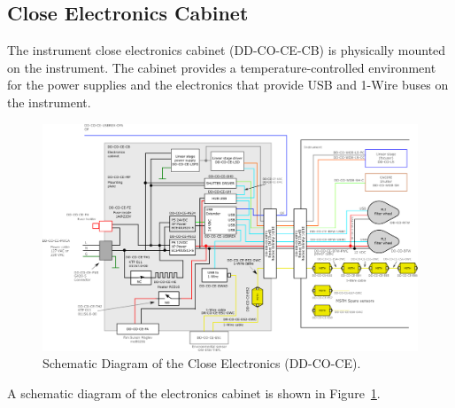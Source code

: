 \documentclass{article}
\begin{document}
\subsection{Close Electronics Cabinet}

The instrument close electronics cabinet (DD-CO-CE-CB) is physically mounted on the instrument. The cabinet provides a temperature-controlled environment for the power supplies and the electronics that provide USB and 1-Wire buses on the instrument.

\begin{figure}[tp]
\begin{center}
\includegraphics[height=0.9\linewidth,angle=90]{figures/CloseElectronics}
\end{center}
\caption{Schematic Diagram of the Close Electronics (DD-CO-CE).}
\label{figure:electronics-cabinet}
\end{figure}


A schematic diagram of the electronics cabinet is shown in Figure~\ref{figure:electronics-cabinet}. 
\end{document}
